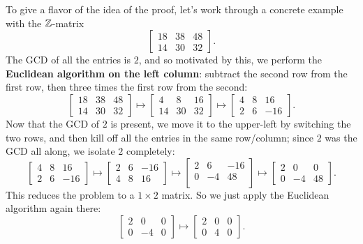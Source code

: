 \begin{example}
	To give a flavor of the idea of the proof,
	let's work through a concrete example with the $\mathbb Z$-matrix
	\[ \begin{bmatrix}
			18 & 38 & 48 \\
			14 & 30 & 32
		\end{bmatrix}.  \]
	The GCD of all the entries is $2$, and so motivated by this,
	we perform the \textbf{Euclidean algorithm on the left column}:
	subtract the second row from the first row,
	then three times the first row from the second:
	\[
		\begin{bmatrix}
			18 & 38 & 48 \\
			14 & 30 & 32
		\end{bmatrix}
		\mapsto
		\begin{bmatrix}
			4 & 8 & 16 \\
			14 & 30 & 32
		\end{bmatrix}
		\mapsto
		\begin{bmatrix}
			4 & 8 & 16 \\
			2 & 6 & -16
		\end{bmatrix}.
	\]
	Now that the GCD of $2$ is present, we move it to the upper-left
	by switching the two rows,
	and then kill off all the entries in the same row/column;
	since $2$ was the GCD all along, we isolate $2$ completely:
	\[
		\begin{bmatrix}
			4 & 8 & 16 \\
			2 & 6 & -16
		\end{bmatrix}
		\mapsto
		\begin{bmatrix}
			2 & 6 & -16 \\
			4 & 8 & 16
		\end{bmatrix}
		\mapsto
		\begin{bmatrix}
			2 & 6 & -16 \\
			0 & -4 & 48 \\
		\end{bmatrix}
		\mapsto
		\begin{bmatrix}
			2 & 0 & 0 \\
			0 & -4 & 48
		\end{bmatrix}.
	\]
	This reduces the problem to a $1 \times 2$ matrix.
	So we just apply the Euclidean algorithm again there:
	\[
		\begin{bmatrix}
			2 & 0 & 0 \\
			0 & -4 & 0
		\end{bmatrix}
		\mapsto
		\begin{bmatrix}
			2 & 0 & 0 \\
			0 & 4 & 0
		\end{bmatrix}.
	\]
\end{example}

